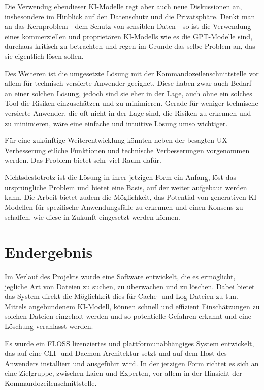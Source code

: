 \documentclass[a4paper,12pt]{report}
\begin{document}
    Die Verwendug ebendieser KI-Modelle regt aber auch neue Diskussionen an, insbesondere im Hinblick auf den Datenschutz und die Privatsphäre.
    Denkt man an das Kernproblem - dem Schutz von sensiblen Daten - so ist die Verwendung eines kommerziellen und proprietären KI-Modells wie es die GPT-Modelle sind, durchaus kritisch zu betrachten
    und regen im Grunde das selbe Problem an, das sie eigentlich lösen sollen.

    Des Weiteren ist die umgesetzte Lösung mit der Kommandozeilenschnittstelle vor allem für technisch versierte Anwender geeignet.
    Diese haben zwar auch Bedarf an einer solchen Lösung, jedoch sind sie eher in der Lage, auch ohne ein solches Tool die Risiken einzuschätzen und zu minimieren.
    Gerade für weniger technische versierte Anwender, die oft nicht in der Lage sind, die Risiken zu erkennen und zu minimieren, wäre eine einfache und intuitive Lösung umso wichtiger.

    Für eine zukünftige Weiterentwicklung könnten neben der besagten UX-Verbesserung etliche Funktionen und technische Verbesserungen vorgenommen werden.
    Das Problem bietet sehr viel Raum dafür.

    Nichtsdestotrotz ist die Lösung in ihrer jetzigen Form ein Anfang, löst das ursprüngliche Problem und bietet eine Basis, auf der weiter aufgebaut werden kann.
    Die Arbeit bietet zudem die Möglichkeit, das Potential von generativen KI-Modellen für spezifische Anwendungsfälle zu erkennen und einen Konsens zu schaffen, wie diese in Zukunft eingesetzt werden können.

    \clearpage


    \section{Endergebnis}\label{sec:endergebnis}
    Im Verlauf des Projekts wurde eine Software entwickelt, die es ermöglicht, jegliche Art von Dateien zu suchen, zu überwachen und zu löschen.
    Dabei bietet das System direkt die Möglichkeit dies für Cache- und Log-Dateien zu tun.
    Mittels angebundenem KI-Modell, können schnell und effizient Einschätzungen zu solchen Dateien eingeholt werden und so potentielle Gefahren erkannt und eine Löschung veranlasst werden.

    Es wurde ein FLOSS lizenziertes und plattformunabhängiges System entwickelt, das auf eine CLI- und Daemon-Architektur setzt und auf dem Host des Anwenders installiert und ausgeführt wird.
    In der jetzigen Form richtet es sich an eine Zielgruppe, zwischen Laien und Experten, vor allem in der Hinsicht der Kommandozeilenschnittstelle.
\end{document}
